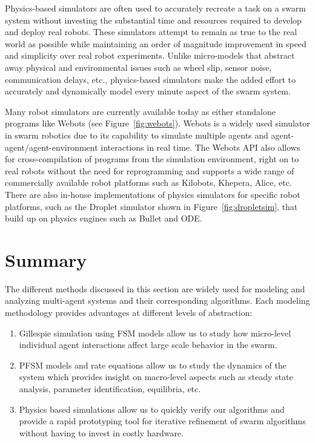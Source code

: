 \documentclass[defaultstyle,12pt]{thesis}
\begin{document}
Physics-based simulators are often used to accurately recreate a task on a swarm system without investing the substantial time and resources required to develop and deploy real robots. These simulators attempt to remain as true to the real world as possible while maintaining an order of magnitude improvement in speed and simplicity over real robot experiments. Unlike micro-models that abstract away physical and environmental issues such as wheel slip, sensor noise, communication delays, etc., physics-based simulators make the added effort to accurately and dynamically model every minute aspect of the swarm system.

Many robot simulators are currently available today as either standalone programs like Webots (see Figure~\ref{fig:webots}). Webots is a widely used simulator in swarm robotics due to its capability to simulate multiple agents and agent-agent/agent-environment interactions in real time. The Webots API also allows for cross-compilation of programs from the simulation environment, right on to real robots without the need for reprogramming and supports a wide range of commercially available robot platforms such as Kilobots, Khepera, Alice, etc. There are also in-house implementations of physics simulators for specific robot platforms, such as the Droplet simulator shown in Figure~\ref{fig:dropletsim}, that build up on physics engines such as Bullet and ODE.

\section{Summary}
The different methods discussed in this section are widely used for modeling and analyzing multi-agent systems and their corresponding algorithms. Each modeling methodology provides advantages at different levels of abstraction:
\begin{enumerate}
	\item Gillespie simulation using FSM models allow us to study how micro-level individual agent interactions affect large scale behavior in the swarm.
	\item PFSM models and rate equations allow us to study the dynamics of the system which provides insight on macro-level aspects such as steady state analysis, parameter identification, equilibria, etc.
	\item Physics based simulations allow us to quickly verify our algorithms and provide a rapid prototyping tool for iterative refinement of swarm algorithms without having to invest in costly hardware.
\end{enumerate}
\end{document}
